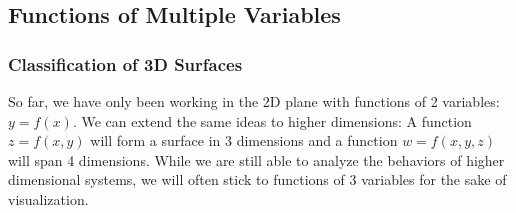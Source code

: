 \subsection{Functions of Multiple Variables}

\subsubsection{Classification of 3D Surfaces}
So far, we have only been working in the 2D plane with functions of 2 variables: $y=f(x)$. We can extend the same ideas to higher dimensions: A function $z=f(x,y)$ will form a surface in 3 dimensions and a function $w=f(x,y,z)$ will span 4 dimensions. While we are still able to analyze the behaviors of higher dimensional systems, we will often stick to functions of 3 variables for the sake of visualization.\\

